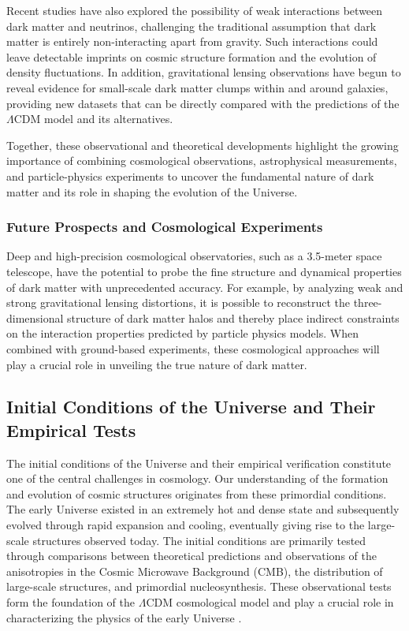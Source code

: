 Recent studies have also explored the possibility of weak interactions between dark matter and neutrinos, challenging the traditional assumption that dark matter is entirely non-interacting apart from gravity. Such interactions could leave detectable imprints on cosmic structure formation and the evolution of density fluctuations. In addition, gravitational lensing observations have begun to reveal evidence for small-scale dark matter clumps within and around galaxies, providing new datasets that can be directly compared with the predictions of the $\Lambda$CDM model and its alternatives.

Together, these observational and theoretical developments highlight the growing importance of combining cosmological observations, astrophysical measurements, and particle-physics experiments to uncover the fundamental nature of dark matter and its role in shaping the evolution of the Universe.

\subsubsection{Future Prospects and Cosmological Experiments}

Deep and high-precision cosmological observatories, such as a 3.5-meter space telescope, have the potential to probe the fine structure and dynamical properties of dark matter with unprecedented accuracy. For example, by analyzing weak and strong gravitational lensing distortions, it is possible to reconstruct the three-dimensional structure of dark matter halos and thereby place indirect constraints on the interaction properties predicted by particle physics models. When combined with ground-based experiments, these cosmological approaches will play a crucial role in unveiling the true nature of dark matter.

\subsection{Initial Conditions of the Universe and Their Empirical Tests}\label{initial-conditions-of-the-universe-and-their-empirical-tests}

The initial conditions of the Universe and their empirical verification constitute one of the central challenges in cosmology. Our understanding of the formation and evolution of cosmic structures originates from these primordial conditions. The early Universe existed in an extremely hot and dense state and subsequently evolved through rapid expansion and cooling, eventually giving rise to the large-scale structures observed today. The initial conditions are primarily tested through comparisons between theoretical predictions and observations of the anisotropies in the Cosmic Microwave Background (CMB), the distribution of large-scale structures, and primordial nucleosynthesis. These observational tests form the foundation of the $\Lambda$CDM cosmological model and play a crucial role in characterizing the physics of the early Universe \cite{akrami2020}.

